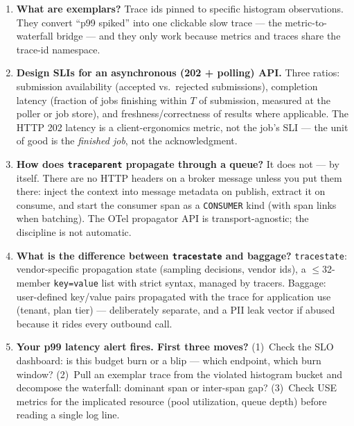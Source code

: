 \begin{enumerate}[label=\textbf{Q\arabic*.}, leftmargin=1.6cm, start=11]
        chunk memory plus ingestion on every scrape. One unbounded label
        (\texttt{user\_id}) turns 90 series into 4.5 million. Labels must
        be dashboard group-bys; unbounded dimensions belong in logs and
        trace attributes.
  \item \textbf{What are exemplars?}
        Trace ids pinned to specific histogram observations. They convert
        ``p99 spiked'' into one clickable slow trace --- the metric-to-
        waterfall bridge --- and they only work because metrics and traces
        share the trace-id namespace.
  \item \textbf{Design SLIs for an asynchronous (202 + polling) API.}
        Three ratios: submission availability (accepted vs.\ rejected
        submissions), completion latency (fraction of jobs finishing within
        $T$ of submission, measured at the poller or job store), and
        freshness/correctness of results where applicable. The HTTP 202
        latency is a client-ergonomics metric, not the job's SLI --- the
        unit of good is the \emph{finished job}, not the acknowledgment.
  \item \textbf{How does \texttt{traceparent} propagate through a queue?}
        It does not --- by itself. There are no HTTP headers on a broker
        message unless you put them there: inject the context into message
        metadata on publish, extract it on consume, and start the consumer
        span as a \texttt{CONSUMER} kind (with span links when batching).
        The OTel propagator API is transport-agnostic; the discipline is
        not automatic.
  \item \textbf{What is the difference between \texttt{tracestate} and
        baggage?}
        \texttt{tracestate}: vendor-specific propagation state (sampling
        decisions, vendor ids), a $\le$32-member \texttt{key=value} list
        with strict syntax, managed by tracers. Baggage: user-defined
        key/value pairs propagated with the trace for application use
        (tenant, plan tier) --- deliberately separate, and a PII leak
        vector if abused because it rides every outbound call.
  \item \textbf{Your p99 latency alert fires. First three moves?}
        (1)~Check the SLO dashboard: is this budget burn or a blip ---
        which endpoint, which burn window? (2)~Pull an exemplar trace from
        the violated histogram bucket and decompose the waterfall:
        dominant span or inter-span gap? (3)~Check USE metrics for the
        implicated resource (pool utilization, queue depth) before reading
        a single log line.
\end{enumerate}

